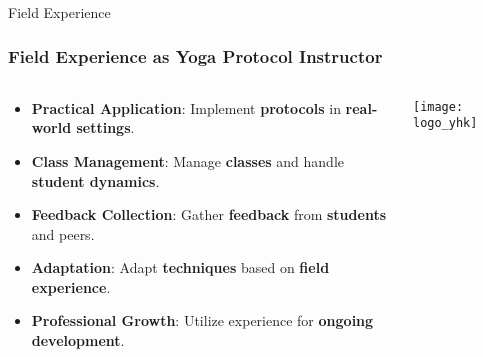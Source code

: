 \begin{frame}[fragile]\frametitle{}
\begin{center}
{\Large Field Experience }
\end{center}
\end{frame}

\begin{frame}[fragile]\frametitle{Field Experience as Yoga Protocol Instructor}
\begin{columns}
    \begin{column}[T]{0.5\linewidth}
      \begin{itemize}
        \item \textbf{Practical Application}: Implement \textbf{protocols} in \textbf{real-world settings}.
        \item \textbf{Class Management}: Manage \textbf{classes} and handle \textbf{student dynamics}.
        \item \textbf{Feedback Collection}: Gather \textbf{feedback} from \textbf{students} and peers.
        \item \textbf{Adaptation}: Adapt \textbf{techniques} based on \textbf{field experience}.
        \item \textbf{Professional Growth}: Utilize experience for \textbf{ongoing development}.
      \end{itemize}
    \end{column}
    \begin{column}[T]{0.5\linewidth}
        \begin{center}
        \texttt{[image: logo\_yhk]}
        \end{center}	
    \end{column}
\end{columns}
\end{frame}
